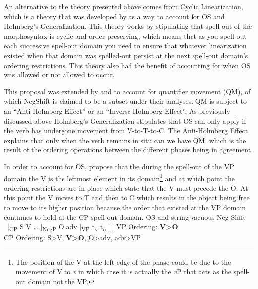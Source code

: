 \documentclass[12pt, letterpaper]{article}
\begin{document}
An alternative to the theory presented above comes from Cyclic Linearization, which is a theory that was developed by \citet{foxCyclicLinearizationSyntactic2005} as a way to account for OS and Holmberg's Generalization. This theory works by stipulating that spell-out of the morphosyntax is cyclic and order preserving, which means that as you spell-out each successive spell-out domain you need to ensure that whatever linearization existed when that domain was spelled-out persist at the next spell-out domain's ordering restrictions. This theory also had the benefit of accounting for when OS was allowed or not allowed to occur. 

This proposal was extended by \citet{foxCyclicLinearizationSyntactic2005} and \citet{engelsMicrovariationObjectPositions2011,engelsScandinavianNegativeIndefinites2012} to account for quantifier movement (QM), of which NegShift is claimed to be a subset under their analyses. QM is subject to an ``Anti-Holmberg Effect'' or an ``Inverse Holmberg Effect''. As previously discussed above Holmberg's Generalization stipulates that OS can only apply if the verb has undergone movement from V-to-T-to-C. The Anti-Holmberg Effect explains that only when the verb remains in situ can we have QM, which is the result of the ordering operations between the different phases being in agreement. 

In order to account for OS, \citeauthor{foxCyclicLinearizationSyntactic2005} propose that the during the spell-out of the VP domain the V is the leftmost element in its domain\footnote{The position of the V at the left-edge of the phase could be due to the movement of V to \textit{v} in which case it is actually the \textit{v}P that acts as the spell-out domain not the VP.} and at which point the ordering restrictions are in place which state that the V must precede the O. At this point the V moves to T and then to C which results in the object being free to move to its higher position because the order that existed at the VP domain continues to hold at the CP spell-out domain. 
\ea OS and string-vacuous Neg-Shift
 	\ea ~[\textsubscript{CP} S V … [\textsubscript{NegP} O adv [\textsubscript{VP} t\textsubscript{v} t\textsubscript{o} ]]]
	\ex VP Ordering: \textbf{V>O}\\
		CP Ordering: S>V, \textbf{V>O}, O>adv, adv>VP
	\z
\z
\end{document}
